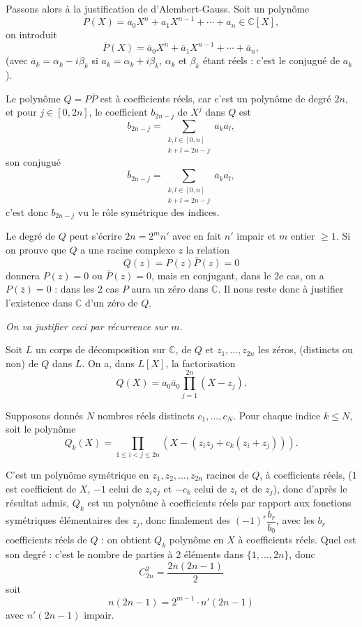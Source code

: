 Passons alors à la justification de d'Alembert-Gauss. Soit un polynôme
\[
P(X)=a_0X^n+a_1X^{n-1}+\cdots+a_n\in\mathbb C[X],
\]
on introduit
\[
\overline P(X)=\overline a_0X^n+\overline a_1X^{n-1}+\cdots+\overline a_n,
\]
(avec $\overline a_k=\alpha_k-i\beta_k$ si $a_k=\alpha_k+i\beta_k$, $\alpha_k$ et $\beta_k$ étant réels : c'est le conjugué de $a_k$).

Le polynôme $Q=P\overline P$ est à coefficients réels, car c'est un polynôme de degré $2n$, et pour $j\in[0,2n]$, le coefficient $b_{2n-j}$ de $X^j$ dans $Q$ est
\[
b_{2n-j}=\sum_{\substack{k,l\in[0,n]\\k+l=2n-j}}a_k\overline a_l,
\]
son conjugué
\[
\overline b_{2n-j}=\sum_{\substack{k,l\in[0,n]\\k+l=2n-j}}\overline a_k a_l,
\]
c'est donc $b_{2n-j}$ vu le rôle symétrique des indices.

Le degré de $Q$ peut s'écrire $2n=2^mn'$ avec en fait $n'$ impair et $m$ entier $\ge1$. Si on prouve que $Q$ a une racine complexe $z$ la relation
\[
Q(z)=P(z)\overline P(z)=0
\]
donnera $P(z)=0$ ou $\overline P(z)=0$, mais en conjugant, dans le 2e cas, on a $P(\overline z)=0$ : dans les 2 cas $P$ aura un zéro dans $\mathbb C$. Il nous reste donc à justifier l'existence dans $\mathbb C$ d'un zéro de $Q$.

\emph{On va justifier ceci par récurrence sur $m$.}

Soit $L$ un corps de décomposition sur $\mathbb C$, de $Q$ et $z_1,\ldots,z_{2n}$ les zéros, (distincts ou non) de $Q$ dans $L$. On a, dans $L[X]$, la factorisation
\[
Q(X)=a_0\overline a_0\prod_{j=1}^{2n}(X-z_j).
\]

Supposons donnés $N$ nombres réels distincts $c_1,\ldots,c_N$. Pour chaque indice $k\le N$, soit le polynôme
\[
Q_k(X)=\prod_{1\le i<j\le2n}\left(X-(z_i z_j+c_k(z_i+z_j))\right).
\]

C'est un polynôme symétrique en $z_1,z_2,\ldots,z_{2n}$ racines de $Q$, à coefficients réels, (1 est coefficient de $X$, $-1$ celui de $z_iz_j$ et $-c_k$ celui de $z_i$ et de $z_j$), donc d'après le résultat admis, $Q_k$ est un polynôme à coefficients réels par rapport aux fonctions symétriques élémentaires des $z_j$, donc finalement des $(-1)^r\dfrac{b_r}{b_0}$, avec les $b_r$ coefficients réels de $Q$ : on obtient $Q_k$ polynôme en $X$ à coefficients réels. Quel est son degré : c'est le nombre de parties à 2 éléments dans $\{1,\ldots,2n\}$, donc
\[
C_{2n}^2=\frac{2n(2n-1)}2
\]
soit
\[
n(2n-1)=2^{m-1}\cdot n'(2n-1)
\]
avec $n'(2n-1)$ impair.

